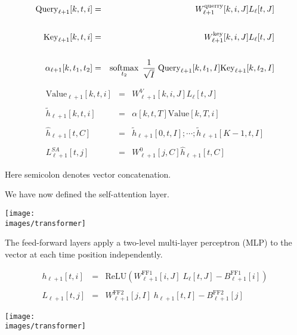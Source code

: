{{\huge
\begin{eqnarray*}
\mathrm{Query}_{\ell+1}[k,t,i] & = & W^\mathrm{querry}_{\ell+1}[k,i,J]L_\ell[t,J] \\
\\
\mathrm{Key}_{\ell+1}[k,t,i] & = &  W^\mathrm{key}_{\ell+1}[k,i,J]L_\ell[t,J] \\
\\
\alpha_{\ell+1}[k,t_1,t_2] & = & \operatorname*{softmax}_{t_2}\; \frac{1}{\sqrt{I}}\;\mathrm{Query}_{\ell+1}[k,t_1,I]\mathrm{Key}_{\ell+1}[k,t_2,I]
\end{eqnarray*}
}

      
\begin{eqnarray*}
\mathrm{Value}_{\ell+1}[k,t,i] & = & W^V_{\ell+1}[k,i,J]L_\ell[t,J] \\
\\
\tilde{h}_{\ell+1}[k,t,i] & = & \alpha[k,t,T]\mathrm{Value}[k,T,i] \\
\\
\hat{h}_{\ell+1}[t,C] & = & \tilde{h}_{\ell+1}[0,t,I];\cdots;\tilde{h}_{\ell+1}[K-1,t,I] \\
\\
L^{SA}_{\ell+1}[t,j] & = & W^0_{\ell+1}[j,C]\hat{h}_{\ell+1}[t,C]
\end{eqnarray*}

\vfill
Here semicolon denotes vector concatenation.


We have now defined the self-attention layer.
\vfill
\centerline{\texttt{[image: \\images/transformer]}}


The feed-forward layers apply a two-level multi-layer perceptron (MLP) to the vector at each time position independently.

\vfill

\begin{eqnarray*}
h_{\ell+1}[t,i] & = & \mathrm{ReLU}(W^{\mathrm{FF1}}_{\ell+1}[i,J]\;L_\ell[t,J] - B^{\mathrm{FF1}}_{\ell+1}[i]) \\
\\
L_{\ell+1}[t,j] & = & W^{\mathrm{FF2}}_{\ell+1}[j,I]\;h_{\ell+1}[t,I] - B^\mathrm{FF2}_{\ell+1}[j]
\end{eqnarray*}


\centerline{\texttt{[image: \\images/transformer]}}

}

